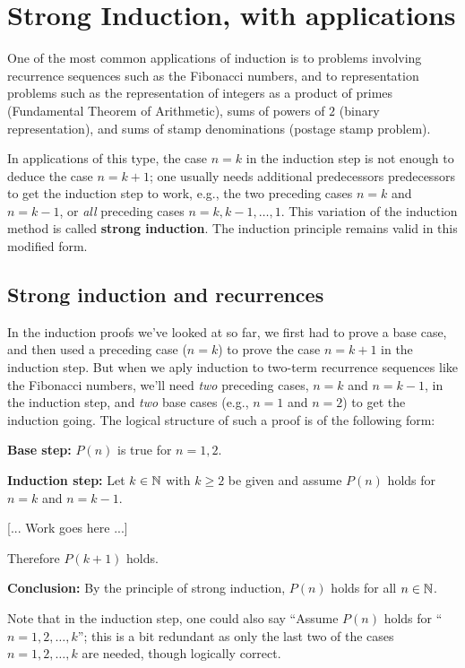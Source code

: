 \section{Strong Induction, with applications}\label{strong_induction}


One of the most common applications of induction is to problems involving
recurrence sequences such as the Fibonacci numbers, and to representation
problems such as the representation of integers as a product of primes
(Fundamental Theorem of Arithmetic), sums of powers of $2$ (binary
representation), and sums of stamp denominations (postage stamp problem).

In applications of this type, the case $n=k$ in the induction step is
not enough to deduce the case $n=k+1$; one usually needs additional
predecessors predecessors to get the induction step to work, e.g., 
the two preceding cases $n=k$ and $n=k-1$, or 
\emph{all} preceding cases
$n=k,k-1,\dots,1$.  This variation of the induction
method is called \textbf{strong induction}.  The induction principle
remains valid in this modified form. 


\subsection*{Strong induction and recurrences}
In the induction proofs we've looked at so far, we first had to prove a base case, and then used a preceding case ($n=k$) to prove the case $n=k+1$ in the induction step. But when we aply  induction to two-term recurrence sequences like the Fibonacci
numbers, we'll need \emph{two} preceding cases, $n=k$ and $n=k-1$, in
the induction step, and \emph{two} base cases (e.g., $n=1$ and $n=2$) to get
the induction going.  The logical structure of such a proof is of the
following form:

\noindent
\textbf{Base step:}  $P(n)$ is true for $n=1,2$.
\smallskip

\noindent
\textbf{Induction step:} Let $k\in\mathbb{N}$ with $k\ge 2$ be given
and assume $P(n)$ holds for $n=k$ and $n=k-1$.
\medskip

[... Work goes here ...] 
\medskip

\noindent
Therefore $P(k+1)$ holds.
\smallskip

\noindent
\textbf{Conclusion:} By the principle of strong induction, 
$P(n)$ holds for all $n\in\mathbb{N}$.
\smallskip

\noindent
Note that in the induction step, one could also say ``Assume
$P(n)$ holds for `` $n=1,2,\dots, k$''; this is a bit redundant as only
the last two of the cases $n=1,2,\dots,k$ are needed, though logically
correct. 

